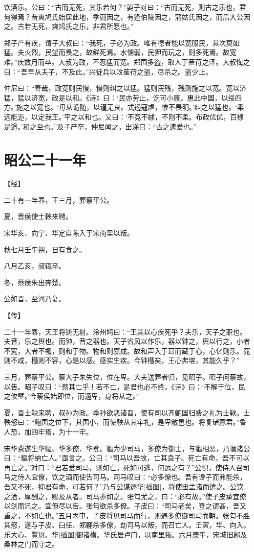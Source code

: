 \documentclass[a4paper,12pt,UTF8,twoside]{ctexbook}
\begin{document}
饮酒乐。公曰：“古而无死，其乐若何？”晏子对曰：“古而无死，则古之乐也，君何得焉？昔爽鸠氏始居此地，季荝因之，有逢伯陵因之，蒲姑氏因之，而后大公因之。古若无死，爽鸠氏之乐，非君所愿也。”

郑子产有疾，谓子大叔曰：“我死，子必为政。唯有德者能以宽服民，其次莫如猛。夫火烈，民望而畏之，故鲜死焉。水懦弱，民狎而玩之，则多死焉。故宽难。”疾数月而卒。大叔为政，不忍猛而宽。郑国多盗，取人于萑苻之泽。大叔悔之曰：“吾早从夫子，不及此。”兴徒兵以攻萑苻之盗，尽杀之。盗少止。

仲尼曰：“善哉，政宽则民慢，慢则纠之以猛。猛则民残，残则施之以宽。宽以济猛，猛以济宽，政是以和。《诗》曰：‘民亦劳止，汔可小康。惠此中国，以绥四方。’施之以宽也。‘毋从诡随，以谨无良。式遏寇虐，惨不畏明。’纠之以猛也。‘柔远能迩，以定我王。’平之以和也。又曰：‘不竞不絿，不刚不柔。布政优优，百禄是遒。’和之至也。”及子产卒，仲尼闻之，出涕曰：“古之遗爱也。”


\chapter{昭公二十一年}


【经】

二十有一年春，王三月，葬蔡平公。

夏，晋侯使士鞅来聘。

宋华亥、向宁、华定自陈入于宋南里以叛。

秋七月壬午朔，日有食之。

八月乙亥，叔辄卒。

冬，蔡侯朱出奔楚。

公如晋，至河乃复。

【传】

二十一年春，天王将铸无射。泠州鸠曰：“王其以心疾死乎？夫乐，天子之职也。夫音，乐之舆也。而钟，音之器也。天子省风以作乐，器以钟之，舆以行之，小者不窕，大者不槬，则和于物。物和则嘉成。故和声入于耳而藏于心，心亿则乐。窕则不咸，槬则不容，心是以感。感实生疾。今钟槬矣，王心弗堪，其能久乎？”

三月，葬蔡平公。蔡大子朱失位，位在卑。大夫送葬者归，见昭子。昭子问蔡故，以告。昭子叹曰：“蔡其亡乎！若不亡，是君也必不终。《诗》曰：‘不解于位，民之攸塈。’今蔡侯始即位，而適卑，身将从之。”

夏，晋士鞅来聘，叔孙为政。季孙欲恶诸晋，使有司以齐鲍国归费之礼为士鞅。士鞅怒曰：“鲍国之位下，其国小，而使鞅从其牢礼，是卑敝邑也。将复诸寡君。”鲁人恐，加四牢焉，为十一牢。

宋华费遂生华貙、华多僚、华登。貙为少司马，多僚为御士，与貙相恶，乃谮诸公曰：“貙将纳亡人。”亟言之。公曰：“司马以吾故，亡其良子。死亡有命，吾不可以再亡之。”对曰：“君若爱司马，则如亡。死如可逃，何远之有？”公惧，使侍人召司马之侍人宜僚，饮之酒而使告司马。司马叹曰：“必多僚也。吾有谗子而弗能杀，吾又不死，抑君有命，可若何？”乃与公谋逐华[插图]，将使田孟诸而遣之。公饮之酒，厚酬之，赐及从者。司马亦如之。张匄尤之，曰：“必有故。”使子皮承宜僚以剑而讯之。宜僚尽以告。张匄欲杀多僚。子皮曰：“司马老矣，登之谓甚，吾又重之，不如亡也。”五月丙申，子皮将见司马而行，则遇多僚御司马而朝。张匄不胜其怒，遂与子皮、臼任、郑翩杀多僚，劫司马以叛，而召亡人。壬寅，华、向入。乐大心、豐愆、华[插图]御诸横。华氏居卢门，以南里叛。六月庚午，宋城旧鄘及桑林之门而守之。
\end{document}
